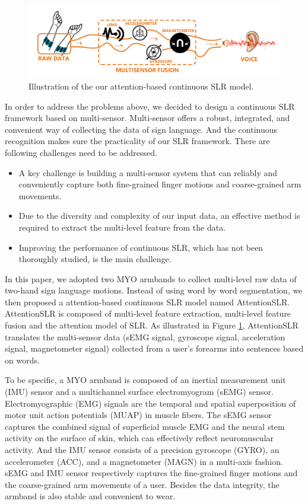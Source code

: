 \documentclass[10pt, conference, letterpaper]{IEEEtran}
\begin{document}
\begin{figure}[!t]
  \centering
  \vspace{-3mm}
  \includegraphics[width=1.0\columnwidth]{pics/1.pdf}
  \caption{Illustration of the our attention-based continuous SLR model.}
  \label{fig:highlevel}
\end{figure}
\vspace{-1mm}

In order to address the problems above, we decided to design a continuous SLR framework based on multi-sensor. Multi-sensor offers a robust, integrated, and convenient way of collecting the data of sign language. And the continuous recognition makes sure the practicality of our SLR framework. There are following challenges need to be addressed. 
\begin{itemize}
\item A key challenge is building a multi-sensor system that can reliably and conveniently capture both fine-grained finger motions and coarse-grained arm movements.
\item Due to the diversity and complexity of our input data, an effective method is required to extract the multi-level feature from the data.
\item Improving the performance of continuous SLR, which has not been thoroughly studied, is the main challenge.
\end{itemize} 

In this paper, we adopted two MYO \cite{timmurphy.org} armbands to collect multi-level raw data of two-hand sign language motions. Instead of using word by word segmentation, we then proposed a attention-based continuous SLR model named AttentionSLR. AttentionSLR is composed of multi-level feature extraction, multi-level feature fusion and the attention model of SLR. As illustrated in Figure \ref{fig:highlevel}, AttentionSLR translates the multi-sensor data (sEMG signal, gyroscope signal, acceleration signal, magnetometer signal) collected from a user's forearms into sentences based on words. 

To be specific, a MYO armband is composed of an inertial measurement unit (IMU) sensor and a multichannel surface electromyogram (sEMG) sensor. Electromyographic (EMG) signals are the temporal and spatial superposition of motor unit action potentials (MUAP) in muscle fibers. The sEMG sensor captures the combined signal of superficial muscle EMG and the neural stem activity on the surface of skin, which can effectively reflect neuromuscular activity. And the IMU sensor consists of a precision gyroscope (GYRO), an accelerometer (ACC), and a magnetometer (MAGN) in a multi-axis fashion. sEMG and IMU sensor respectively captures the fine-grained finger motions and the coarse-grained arm movements of a user. Besides the data integrity, the armband is also stable and convenient to wear.
\end{document}
